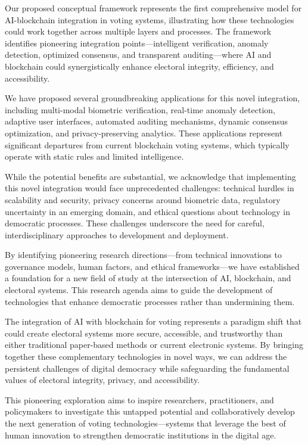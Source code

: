 \documentclass[conference]{IEEEtran}
\begin{document}
Our proposed conceptual framework represents the first comprehensive model for AI-blockchain integration in voting systems, illustrating how these technologies could work together across multiple layers and processes. The framework identifies pioneering integration points—intelligent verification, anomaly detection, optimized consensus, and transparent auditing—where AI and blockchain could synergistically enhance electoral integrity, efficiency, and accessibility.

We have proposed several groundbreaking applications for this novel integration, including multi-modal biometric verification, real-time anomaly detection, adaptive user interfaces, automated auditing mechanisms, dynamic consensus optimization, and privacy-preserving analytics. These applications represent significant departures from current blockchain voting systems, which typically operate with static rules and limited intelligence.

While the potential benefits are substantial, we acknowledge that implementing this novel integration would face unprecedented challenges: technical hurdles in scalability and security, privacy concerns around biometric data, regulatory uncertainty in an emerging domain, and ethical questions about technology in democratic processes. These challenges underscore the need for careful, interdisciplinary approaches to development and deployment.

By identifying pioneering research directions—from technical innovations to governance models, human factors, and ethical frameworks—we have established a foundation for a new field of study at the intersection of AI, blockchain, and electoral systems. This research agenda aims to guide the development of technologies that enhance democratic processes rather than undermining them.

The integration of AI with blockchain for voting represents a paradigm shift that could create electoral systems more secure, accessible, and trustworthy than either traditional paper-based methods or current electronic systems. By bringing together these complementary technologies in novel ways, we can address the persistent challenges of digital democracy while safeguarding the fundamental values of electoral integrity, privacy, and accessibility.

This pioneering exploration aims to inspire researchers, practitioners, and policymakers to investigate this untapped potential and collaboratively develop the next generation of voting technologies—systems that leverage the best of human innovation to strengthen democratic institutions in the digital age.
\end{document}
